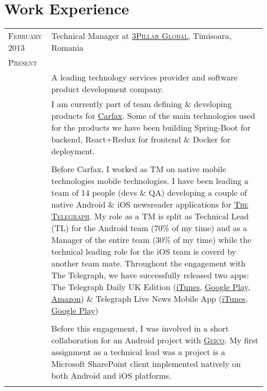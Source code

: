 \documentclass[a4paper,10pt]{article}
\begin{document}
\section{Work Experience}
\begin{longtable}{p{2.5cm}|p{11cm}}

 \raggedleft \textsc{February 2013} & Technical Manager at
 \textsc{\href{http://www.3pillarglobal.com/}{3Pillar Global}}, Timisoara, Romania
 \\\raggedleft \textsc{Present}\\ 
& \footnotesize{A leading technology services provider and software product development company.}\\
& \footnotesize{I am currently part of team defining \& developing products for \href{https://www.carfax.com/}{Carfax}. Some of the main technologies used for the products we have been building Spring-Boot for backend, React+Redux for frontend \& Docker for deployment.}\\ \\
& \footnotesize{Before Carfax, I worked as TM on native mobile technologies mobile technologies. I have been leading a team of 14 people (devs \& QA) developing a couple of native Android \& iOS newsreader applications for \textsc{\href{http://www.telegraph.co.uk/}{The Telegraph}}. My role as a TM is split as Technical Lead (TL) for the Android team (70\% of my time) and as a Manager of the entire team (30\% of  my time) while the technical leading role for the iOS team is coverd by another team mate. Throughout the engagement with The Telegraph, we have successfully released two apps: The Telegraph Daily UK Edition (\href{https://itunes.apple.com/gb/app/telegraph-daily-uk-edition/id388947468?mt=8}{iTunes}, \href{https://play.google.com/store/apps/details?id=uk.co.telegraph.kindlefire&hl=en}{Google Play}, \href{http://www.amazon.co.uk/The-Telegraph-Daily-UK-Edition/dp/B00DHIWONS}{Amazon}) \& Telegraph Live News Mobile App (\href{https://itunes.apple.com/us/app/telegraph-live-news-mobile/id303301873?mt=8}{iTunes}, \href{https://play.google.com/store/apps/details?id=uk.co.telegraph.android&hl=en}{Google Play})}\\ \\
& \footnotesize{Before this engagement, I was involved in a short collaboration for an Android project with \textsc{\href{https://www.geico.com/}{Geico}}. My first assignment as a technical lead was a project is a Microsoft SharePoint client implemented natively on both Android and iOS platforms.}\\ \\

\end{longtable}
\end{document}
